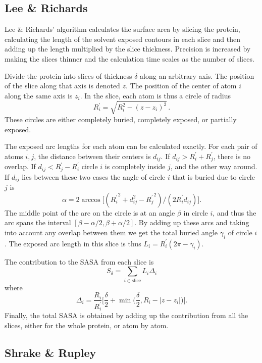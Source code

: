 \documentclass[a4paper,11pt]{article}
\begin{document}
\subsection{Lee \& Richards} \label{sec:alg_LnR}

Lee \& Richards' algorithm calculates the surface area by slicing the
protein, calculating the length of the solvent exposed contours in
each slice and then adding up the length multiplied by the slice
thickness. Precision is increased by making the slices thinner and the
calculation time scales as the number of slices.

Divide the protein into slices of thickness $\delta$ along an
arbitrary axis. The position of the slice along that axis is denoted
$z$. The position of the center of atom $i$ along the same axis is
$z_i$. In the slice, each atom is thus a circle of radius $$R_i^\prime
= \sqrt{R_i^2-(z-z_i)^2}\,.$$ These circles are either completely buried,
completely exposed, or partially exposed.

The exposed arc lengths for each atom can be calculated exactly. For
each pair of atoms $i,j$, the distance between their centers is
$d_{ij}$. If $d_{ij} > R_i^\prime + R_j^\prime$, there is no
overlap. If $d_{ij} < R_j^\prime - R_i^\prime$ circle $i$ is
completely inside $j$, and the other way around. If $d_{ij}$ lies
between these two cases the angle of circle $i$ that is buried due to
circle $j$ is $$\alpha = 2\arccos \bigl[({R_i^\prime}^2 + d_{ij}^2 -
  {R_{j}^\prime}^2)/(2R_i^\prime d_{ij})\bigr].$$ The middle point of
the arc on the circle is at an angle $\beta$ in circle $i$, and thus the
arc spans the interval $[\beta-\alpha/2,\beta+\alpha/2]$. By adding up
these arcs and taking into account any overlap between them we get
the total buried angle $\gamma_i$ of circle $i$. The exposed arc length in
this slice is thus $L_i = R_i^\prime(2\pi-\gamma_i)$.

The contribution to the SASA from each slice is $$ S_\delta =
\sum_{i \in \text{slice}}L_i\Delta_i $$ where
$$
  \Delta_i = \frac{R_i}{R_i^\prime} \biggl[\frac{\delta}{2} 
    + \min\biggl(\frac{\delta}{2},R_i -
    \lvert z - z_i \rvert\biggr)\biggr]. 
$$ 
Finally, the total SASA is obtained by adding up the contribution from
all the slices, either for the whole protein, or atom by atom.

\subsection{Shrake \& Rupley}
\end{document}
